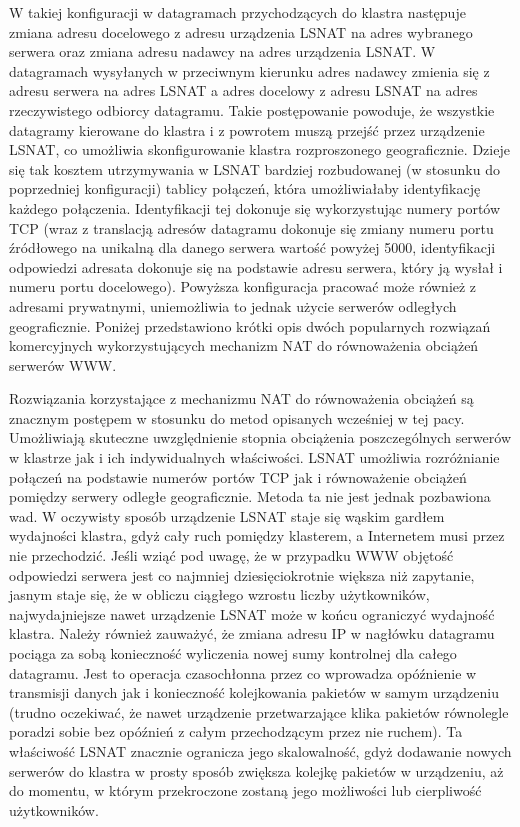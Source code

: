 W takiej konfiguracji w datagramach przychodzących do klastra następuje zmiana adresu docelowego z adresu 
urządzenia LSNAT na adres wybranego serwera oraz zmiana adresu nadawcy na adres urządzenia LSNAT. W datagramach 
wysyłanych w przeciwnym kierunku adres nadawcy zmienia się z adresu serwera na adres LSNAT a adres docelowy z 
adresu LSNAT na adres rzeczywistego odbiorcy datagramu. Takie postępowanie powoduje, że wszystkie datagramy 
kierowane do klastra i z powrotem muszą przejść przez urządzenie LSNAT, co umożliwia skonfigurowanie klastra 
rozproszonego geograficznie. Dzieje się tak kosztem utrzymywania w LSNAT bardziej rozbudowanej (w stosunku do 
poprzedniej konfiguracji) tablicy połączeń, która umożliwiałaby identyfikację każdego połączenia. Identyfikacji 
tej dokonuje się wykorzystując numery portów TCP (wraz z translacją adresów datagramu dokonuje się zmiany 
numeru portu źródłowego na unikalną dla danego serwera wartość powyżej 5000, identyfikacji odpowiedzi adresata
dokonuje się na podstawie adresu serwera, który ją wysłał i numeru portu docelowego). Powyższa konfiguracja 
pracować może również z adresami prywatnymi, uniemożliwia to jednak użycie serwerów odległych geograficznie.
Poniżej przedstawiono krótki opis dwóch popularnych rozwiązań komercyjnych wykorzystujących mechanizm 
NAT do równoważenia obciążeń serwerów WWW.

Rozwiązania korzystające z mechanizmu NAT do równoważenia obciążeń są znacznym postępem w stosunku do metod 
opisanych wcześniej w tej pacy. Umożliwiają skuteczne uwzględnienie stopnia obciążenia poszczególnych serwerów 
w klastrze jak i ich indywidualnych właściwości. LSNAT umożliwia rozróżnianie połączeń na podstawie numerów 
portów TCP jak i równoważenie obciążeń pomiędzy serwery odległe geograficznie. Metoda ta nie jest jednak 
pozbawiona wad. W oczywisty sposób urządzenie LSNAT staje się wąskim gardłem wydajności klastra, gdyż cały 
ruch pomiędzy klasterem, a Internetem musi przez nie przechodzić. Jeśli wziąć pod uwagę, że w przypadku WWW 
objętość odpowiedzi serwera jest co najmniej dziesięciokrotnie większa niż zapytanie, jasnym staje się, że w 
obliczu ciągłego wzrostu liczby użytkowników, najwydajniejsze nawet urządzenie LSNAT może w końcu ograniczyć 
wydajność klastra. Należy również zauważyć, że zmiana adresu IP w nagłówku datagramu pociąga za sobą 
konieczność wyliczenia nowej sumy kontrolnej dla całego datagramu. Jest to operacja czasochłonna przez co 
wprowadza opóźnienie w transmisji danych jak i konieczność kolejkowania pakietów w samym urządzeniu (trudno 
oczekiwać, że nawet urządzenie przetwarzające klika pakietów równolegle poradzi sobie bez opóźnień z całym 
przechodzącym przez nie ruchem). Ta właściwość LSNAT znacznie ogranicza jego skalowalność, gdyż dodawanie 
nowych serwerów do klastra w prosty sposób zwiększa kolejkę pakietów w urządzeniu, aż do momentu, w którym 
przekroczone zostaną jego możliwości lub cierpliwość użytkowników. 

